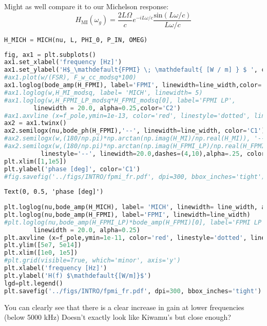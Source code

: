 Might as well compare it to our Michelson response:
\[ H_{\mathrm{MI}}(\omega_g) = \frac{2 L \Omega}{c}e^{-i L \omega / c} \frac{\mathrm{sin}(L \omega /c)}{L \omega /c} \]

\begin{lstlisting}[frame=single, language=Python]
H_MICH = MICH(nu, L, PHI_0, P_IN, OMEG)
\end{lstlisting}

\begin{lstlisting}[frame=single, language=Python]
fig, ax1 = plt.subplots()
ax1.set_xlabel('frequency [Hz]')
ax1.set_ylabel('H$_\mathdefault{FPMI} \; \mathdefault{ [W / m] } $ ', color='C0')
#ax1.plot(w/(FSR), F_w_cc_modsq*100)
ax1.loglog(bode_amp(H_FPMI), label='FPMI', linewidth=line_width,color='C0')
#ax1.loglog(w,H_MI_modsq, label= 'MICH', linewidth= 5)
#ax1.loglog(w,H_FPMI_LP_modsq*H_FPMI_modsq[0], label='FPMI LP', 
	    linewidth = 20.0, alpha=0.25,color='C2')
#ax1.axvline (x=f_pole,ymin=1e-13, color='red', linestyle='dotted', linewidth=3)
ax2 = ax1.twinx()
ax2.semilogx(nu,bode_ph(H_FPMI),'--', linewidth=line_width, color='C1')
#ax2.semilogx(w,(180/np.pi)*np.arctan(np.imag(H_MI)/np.real(H_MI)), '--')
#ax2.semilogx(w,(180/np.pi)*np.arctan(np.imag(H_FPMI_LP)/np.real(H_FPMI_LP)),
	      linestyle='--', linewidth=20.0,dashes=(4,10),alpha=.25, color='C2')
plt.xlim([1,1e5])
plt.ylabel('phase [deg]', color='C1')
#fig.savefig('../figs/INTRO/fpmi_fr.pdf', dpi=300, bbox_inches='tight')
\end{lstlisting}

\begin{lstlisting}
Text(0, 0.5, 'phase [deg]')
\end{lstlisting}

\begin{lstlisting}[frame=single, language=Python]
plt.loglog(nu,bode_amp(H_MICH), label= 'MICH', linewidth= line_width, alpha=.5)
plt.loglog(nu,bode_amp(H_FPMI), label='FPMI', linewidth=line_width)
#plt.loglog(nu,bode_amp(H_FPMI_LP)*bode_amp(H_FPMI)[0], label='FPMI LP', 
	    linewidth = 20.0, alpha=0.25)
plt.axvline (x=f_pole,ymin=1e-11, color='red', linestyle='dotted', linewidth=3.0)
plt.ylim([5e7, 5e14])
plt.xlim([1e0, 1e5])
#plt.grid(visible=True, which='minor', axis='y')
plt.xlabel('frequency [Hz]')
plt.ylabel('H(f) $\mathdefault{[W/m]}$')
lgd=plt.legend()
plt.savefig('../figs/INTRO/fpmi_fr.pdf', dpi=300, bbox_inches='tight')
\end{lstlisting}

You can clearly see that there is a clear increase in gain at lower
frequencies (below 5000 kHz) Doesn't exactly look like Kiwamu's but
close enough?


